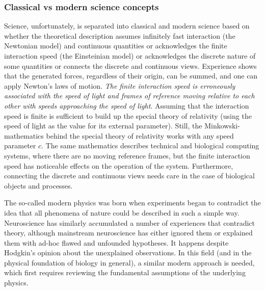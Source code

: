  \subsubsection{Classical vs modern science concepts\label{sec:Physics-ClassicalVsModernScienceConcepts}}

Science, unfortunately, is separated into classical and modern science based on whether the theoretical description assumes infinitely fast interaction (the Newtonian model) and continuous quantities or acknowledges the finite interaction speed (the Einsteinian model) or acknowledges the discrete nature of some quantities or connects the discrete and continuous views. Experience shows that the generated forces, regardless of their origin, can be summed, and one can apply
Newton's laws of motion.
\textit{The finite interaction speed
is erroneously associated with the speed of light and frames of reference
moving relative to each other with speeds approaching the speed of
light}. Assuming that the interaction speed is finite  is sufficient to
build up the special theory of relativity \cite{ModernRelativity:1993} (using the speed
of light as the value for its external parameter).
Still, the Minkowski-mathematics \cite{Minkowski:1908} behind the
special theory of relativity works with any speed parameter $c$.
The same mathematics describes technical \cite{VeghRevisingClassicComputing:2021}
and biological \cite{RoleOfInformationTransferSpeed:2022} computing
systems, where there are no moving reference frames, but the finite
interaction speed has noticeable effects on the operation of the system.
Furthermore, connecting the discrete and continuous views needs care
in the case of biological objects and processes.





The so-called modern physics was born when experiments began to contradict the idea that all phenomena of nature could be described in such a simple way.
Neuroscience has similarly accumulated a number of experiences that contradict theory, although mainstream neuroscience has either ignored them or explained them with ad-hoc flawed and unfounded hypotheses.
It happens despite Hodgkin's opinion about the %
{unexplained observations}.
In this field (and in the physical foundation of biology in general), a similar modern approach is needed, which first requires reviewing the fundamental assumptions of the underlying physics.


